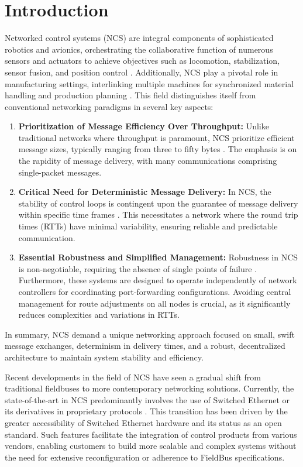 \section{Introduction}
Networked control systems (NCS) are integral components of sophisticated robotics and avionics, orchestrating the collaborative function of numerous sensors and actuators to achieve objectives such as locomotion, stabilization, sensor fusion, and position control \cite{gupta2009networked,moyne2007emergence}. Additionally, NCS play a pivotal role in manufacturing settings, interlinking multiple machines for synchronized material handling and production planning \cite{vitturi2019industrial}. This field distinguishes itself from conventional networking paradigms in several key aspects:

\begin{enumerate}
    \item \textbf{Prioritization of Message Efficiency Over Throughput:} Unlike traditional networks where throughput is paramount, NCS prioritize efficient message sizes, typically ranging from three to fifty bytes \cite{gupta2009networked}. The emphasis is on the rapidity of message delivery, with many communications comprising single-packet messages.
    \item \textbf{Critical Need for Deterministic Message Delivery:} In NCS, the stability of control loops is contingent upon the guarantee of message delivery within specific time frames \cite{moyne2007emergence}. This necessitates a network where the round trip times (RTTs) have minimal variability, ensuring reliable and predictable communication.
    \item \textbf{Essential Robustness and Simplified Management:} Robustness in NCS is non-negotiable, requiring the absence of single points of failure \cite{vitturi2019industrial}. Furthermore, these systems are designed to operate independently of network controllers for coordinating port-forwarding configurations. Avoiding central management for route adjustments on all nodes is crucial, as it significantly reduces complexities and variations in RTTs.
\end{enumerate}

In summary, NCS demand a unique networking approach focused on small, swift message exchanges, determinism in delivery times, and a robust, decentralized architecture to maintain system stability and efficiency.

Recent developments in the field of NCS have seen a gradual shift from traditional fieldbuses to more contemporary networking solutions. Currently, the state-of-the-art in NCS predominantly involves the use of Switched Ethernet or its derivatives in proprietary protocols \cite{gupta2009networked,moyne2007emergence}. This transition has been driven by the greater accessibility of Switched Ethernet hardware and its status as an open standard. Such features facilitate the integration of control products from various vendors, enabling customers to build more scalable and complex systems without the need for extensive reconfiguration or adherence to FieldBus specifications.

